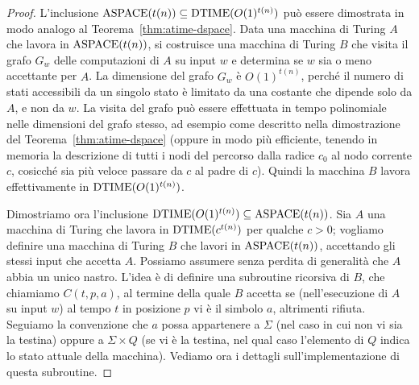 \begin{proof}
  L'inclusione $\operatorname{ASPACE}(t(n)) \subseteq \operatorname{DTIME}(O(1)^{t(n)})$ può essere dimostrata in modo analogo al
  Teorema~\ref{thm:atime-dspace}. Data una macchina di Turing $A$ che lavora in $\operatorname{ASPACE}(t(n))$,
  si costruisce una macchina di Turing $B$ che visita il grafo $G_w$ delle computazioni di $A$ su input $w$
  e determina se $w$ sia o meno accettante per $A$. La dimensione del grafo $G_w$ è $O(1)^{t(n)}$,
  perché il numero di stati accessibili da un singolo stato è limitato da una costante che dipende
  solo da $A$, e non da $w$.
  La visita del grafo può essere effettuata in tempo polinomiale nelle dimensioni del grafo stesso, ad esempio
  come descritto nella dimostrazione del Teorema~\ref{thm:atime-dspace} (oppure in modo più efficiente,
  tenendo in memoria la descrizione di tutti i nodi del percorso dalla radice $c_0$ al nodo corrente $c$,
  cosicché sia più veloce passare da $c$ al padre di $c$).
  Quindi la macchina $B$ lavora effettivamente in $\operatorname{DTIME}(O(1)^{t(n)})$.
  
  Dimostriamo ora l'inclusione $\operatorname{DTIME}(O(1)^{t(n)}) \subseteq \operatorname{ASPACE}(t(n))$.
  Sia $A$ una macchina di Turing che lavora in $\operatorname{DTIME}(c^{t(n)})$ per qualche $c>0$; vogliamo definire una macchina di Turing $B$ che lavori in $\operatorname{ASPACE}(t(n))$, accettando gli stessi input che accetta $A$.
  Possiamo assumere senza perdita di generalità che $A$ abbia un unico nastro.
  L'idea è di definire una subroutine ricorsiva di $B$, che chiamiamo $C(t,p,a)$, al termine della quale $B$ accetta se (nell'esecuzione di $A$ su input $w$) al tempo $t$ in posizione $p$ vi è il simbolo $a$, altrimenti rifiuta.
  Seguiamo la convenzione che $a$ possa appartenere a $\Sigma$ (nel caso in cui non vi sia la testina) oppure a $\Sigma\times Q$ (se vi è la testina, nel qual caso l'elemento di $Q$ indica lo stato attuale della macchina). Vediamo ora i dettagli sull'implementazione di questa subroutine.
  

\end{proof}
